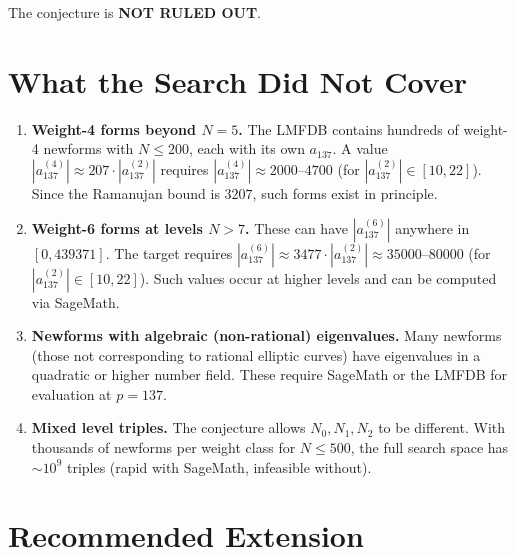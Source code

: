 \documentclass[12pt,a4paper]{article}
\begin{document}
The conjecture is \textbf{NOT RULED OUT}.

\section{What the Search Did Not Cover}

\begin{enumerate}
  \item \textbf{Weight-4 forms beyond $N=5$.}
    The LMFDB contains hundreds of weight-4 newforms with $N \le 200$, each
    with its own $a_{137}$.  A value $|a_{137}^{(4)}| \approx 207 \cdot |a_{137}^{(2)}|$
    requires $|a_{137}^{(4)}| \approx 2000$--$4700$ (for $|a_{137}^{(2)}| \in [10,22]$).
    Since the Ramanujan bound is $3207$, such forms exist in principle.

  \item \textbf{Weight-6 forms at levels $N > 7$.}
    These can have $|a_{137}^{(6)}|$ anywhere in $[0, 439371]$.
    The target requires $|a_{137}^{(6)}| \approx 3477 \cdot |a_{137}^{(2)}|
    \approx 35000$--$80000$ (for $|a_{137}^{(2)}| \in [10, 22]$).
    Such values occur at higher levels and can be computed via SageMath.

  \item \textbf{Newforms with algebraic (non-rational) eigenvalues.}
    Many newforms (those not corresponding to rational elliptic curves) have
    eigenvalues in a quadratic or higher number field.  These require SageMath
    or the LMFDB for evaluation at $p = 137$.

  \item \textbf{Mixed level triples.}
    The conjecture allows $N_0, N_1, N_2$ to be different.  With thousands of
    newforms per weight class for $N \le 500$, the full search space has
    $\sim 10^9$ triples (rapid with SageMath, infeasible without).
\end{enumerate}

\section{Recommended Extension}
\end{document}
